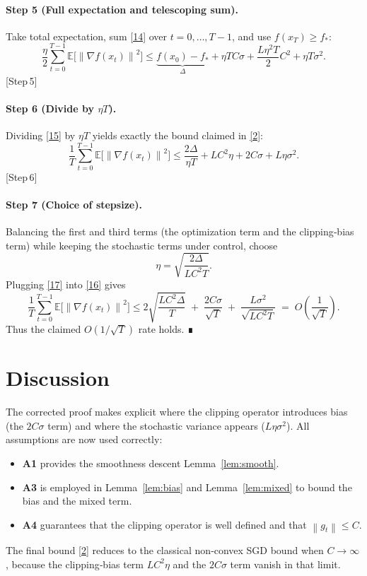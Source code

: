 \documentclass{article}
\newcommand{\norm}[1]{\left\lVert#1\right\rVert}
\newcommand{\E}{\mathbb{E}}
\begin{document}
\paragraph{Step 5 (Full expectation and telescoping sum).}
Take total expectation, sum \eqref{14} over $t=0,\dots,T-1$, and use
$f(x_{T})\ge f_{*}$:
\[
\frac{\eta}{2}\sum_{t=0}^{T-1}\E\!\bigl[\norm{\nabla f(x_{t})}^{2}\bigr]
\le
\underbrace{f(x_{0})-f_{*}}_{\Delta}
+ \eta T C\sigma
+ \frac{L\eta^{2}T}{2}C^{2}
+ \eta T\sigma^{2}.
\tag{15}
\]
[Step 5]

\paragraph{Step 6 (Divide by $\eta T$).}
Dividing \eqref{15} by $\eta T$ yields exactly the bound claimed in
\eqref{2}:
\[
\frac{1}{T}\sum_{t=0}^{T-1}\E\!\bigl[\norm{\nabla f(x_{t})}^{2}\bigr]
\le
\frac{2\Delta}{\eta T}
+ L C^{2}\eta
+ 2C\sigma
+ L\eta\sigma^{2}.
\tag{16}
\]
[Step 6]

\paragraph{Step 7 (Choice of stepsize).}
Balancing the first and third terms (the optimization term and the
clipping‑bias term) while keeping the stochastic terms under control,
choose
\[
\eta = \sqrt{\frac{2\Delta}{L C^{2}T}} .
\tag{17}
\]
Plugging \eqref{17} into \eqref{16} gives
\[
\frac{1}{T}\sum_{t=0}^{T-1}\E\!\bigl[\norm{\nabla f(x_{t})}^{2}\bigr]
\le
2\sqrt{\frac{L C^{2}\Delta}{T}}
\;+\;
\frac{2C\sigma}{\sqrt{T}}
\;+\;
\frac{L\sigma^{2}}{\sqrt{L C^{2}T}}
\;=\;
O\!\left(\frac{1}{\sqrt{T}}\right).
\tag{18}
\]
Thus the claimed $O(1/\sqrt{T})$ rate holds.  ∎

\section*{Discussion}
The corrected proof makes explicit where the clipping operator introduces
bias (the $2C\sigma$ term) and where the stochastic variance appears
($L\eta\sigma^{2}$).  All assumptions are now used correctly:
\begin{itemize}
\item \textbf{A1} provides the smoothness descent Lemma~\ref{lem:smooth}.
\item \textbf{A3} is employed in Lemma~\ref{lem:bias} and Lemma~\ref{lem:mixed}
to bound the bias and the mixed term.
\item \textbf{A4} guarantees that the clipping operator is well defined and
that $\norm{g_{t}}\le C$.
\end{itemize}
The final bound \eqref{2} reduces to the classical non‑convex SGD bound
when $C\to\infty$, because the clipping‑bias term $LC^{2}\eta$ and the
$2C\sigma$ term vanish in that limit.
\end{document}
